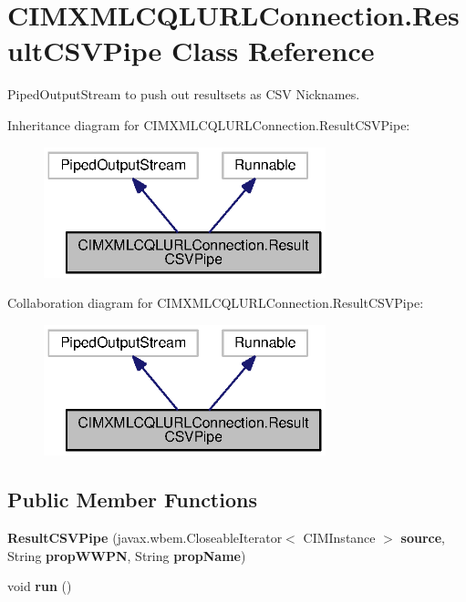 \section{C\+I\+M\+X\+M\+L\+C\+Q\+L\+U\+R\+L\+Connection.\+Result\+C\+S\+V\+Pipe Class Reference}
\label{classorg_1_1smallfoot_1_1parser_1_1cimcql_1_1CIMXMLCQLURLConnection_1_1ResultCSVPipe}


Piped\+Output\+Stream to push out resultsets as C\+S\+V Nicknames.  




Inheritance diagram for C\+I\+M\+X\+M\+L\+C\+Q\+L\+U\+R\+L\+Connection.\+Result\+C\+S\+V\+Pipe\+:
\nopagebreak
\begin{figure}[H]
\begin{center}
\leavevmode
\includegraphics[width=232pt]{classorg_1_1smallfoot_1_1parser_1_1cimcql_1_1CIMXMLCQLURLConnection_1_1ResultCSVPipe__inherit__graph}
\end{center}
\end{figure}


Collaboration diagram for C\+I\+M\+X\+M\+L\+C\+Q\+L\+U\+R\+L\+Connection.\+Result\+C\+S\+V\+Pipe\+:
\nopagebreak
\begin{figure}[H]
\begin{center}
\leavevmode
\includegraphics[width=232pt]{classorg_1_1smallfoot_1_1parser_1_1cimcql_1_1CIMXMLCQLURLConnection_1_1ResultCSVPipe__coll__graph}
\end{center}
\end{figure}
\subsection*{Public Member Functions}
\begin{DoxyCompactItemize}
\item 
{\bf Result\+C\+S\+V\+Pipe} (javax.\+wbem.\+Closeable\+Iterator$<$ C\+I\+M\+Instance $>$ {\bf source}, String {\bf prop\+W\+W\+P\+N}, String {\bf prop\+Name})
\item 
void {\bf run} ()
\end{DoxyCompactItemize}
